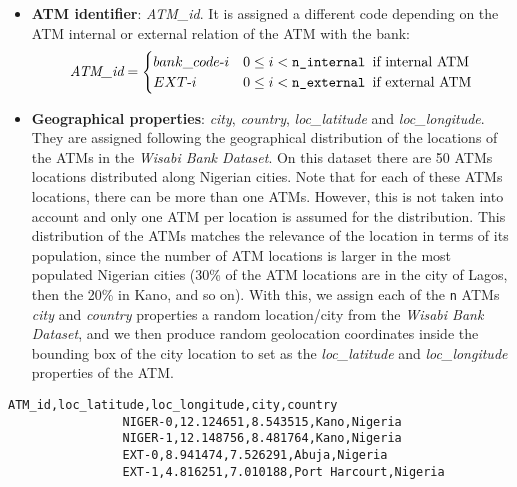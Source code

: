 \begin{itemize}
    \item \textbf{ATM identifier}: \emph{ATM\_id}. It is assigned a different code depending on the ATM internal or external relation of the ATM with the bank: 
        \[
        \emph{ATM\_id} =
        \begin{cases} 
        bank\_code \text{-} i & 0 \leq i < \texttt{n\_internal } \text{if internal ATM}  \\
        EXT \text{-} i & 0 \leq i < \texttt{n\_external } \text{if external ATM}
        \end{cases}
        \]
    \item \textbf{Geographical properties}: \emph{city}, \emph{country}, \emph{loc\_latitude}         and \emph{loc\_longitude}. 
        They are assigned following the geographical distribution of the locations of the ATMs in the \emph{Wisabi Bank Dataset}. 
        On this dataset there are 50 ATMs locations distributed along Nigerian cities. 
        Note that for each of these ATMs locations, there can be more than one ATMs.
        However, this is not taken into account and only one ATM per location is assumed for the 
        distribution. This distribution of the ATMs matches the relevance of the location in terms of its population, since the number of ATM locations is larger in the most populated 
        Nigerian cities (30\% of the ATM locations are in the city of Lagos, then the 20\% in Kano, and so on). With this, we assign each of the \texttt{n} ATMs \emph{city} and \emph{country} properties a random location/city from the \emph{Wisabi Bank Dataset}, and we then produce random geolocation coordinates inside the bounding box of the city location to set as the \emph{loc\_latitude} and \emph{loc\_longitude} properties of the ATM. \\
\end{itemize}

\begin{center}
\lstset{style=csvStyle}
\begin{lstlisting}[caption={Example of atm.csv}, label={csv:atm}]
                ATM_id,loc_latitude,loc_longitude,city,country
                NIGER-0,12.124651,8.543515,Kano,Nigeria
                NIGER-1,12.148756,8.481764,Kano,Nigeria
                EXT-0,8.941474,7.526291,Abuja,Nigeria
                EXT-1,4.816251,7.010188,Port Harcourt,Nigeria
\end{lstlisting}
\end{center}

